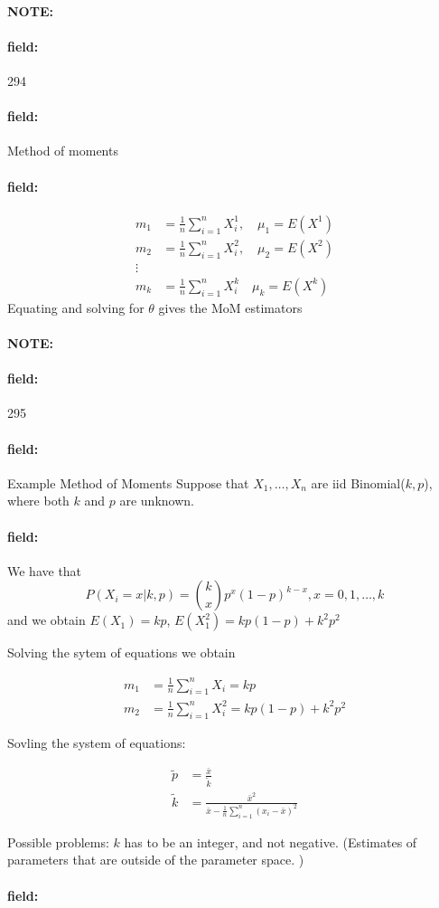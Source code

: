 \documentclass[12pt]{article}
\newenvironment{note}{\paragraph{NOTE:}}{}
\newenvironment{field}{\paragraph{field:}}{}
\begin{document}
\begin{note} \begin{field} \tiny 294 \end{field}
  \begin{field}
    Method of moments
  \end{field}
  \begin{field}
    \begin{align*}
      m_1 &= \frac{1}{n}\sum _{i = 1}^n X_i^1, \quad \mu_1 = E(X^1)\\
      m_2 &= \frac{1}{n}\sum _{i = 1}^n X_i^2, \quad \mu_2 = E(X^2)\\
      \vdots & \\
      m_k &= \frac{1}{n} \sum _{i = 1}^n X_i^k \quad \mu_k = E(X^k)
    \end{align*}
    Equating and solving for $\theta$ gives the MoM estimators
  \end{field}
\end{note}

\begin{note} \begin{field} \tiny 295 \end{field}
  \begin{field}
    Example Method of Moments
    Suppose that $X_1, \ldots , X_n$ are iid Binomial($k,p$), where both $k$ and $p$ are unknown.
  \end{field}
  \begin{field}
    We have that
    $$ P(X_i = x|k,p) = \binom{k}{x}p^x(1-p)^{k-x}, x = 0,1,\ldots,k$$
     and we obtain $E(X_1) = kp$, $E(X_1^2) = kp(1-p) + k^2p^2$

    Solving the sytem of equations we obtain

    \begin{align*}
      m_1 &= \frac{1}{n} \sum _{i = 1}^n X_i = kp\\
      m_2 &= \frac{1}{n} \sum _{i = 1}^n X_i^2 = kp(1-p) + k^2p^2
    \end{align*}

    Sovling the system of equations:

    \begin{align*}
      \tilde{p} &= \frac{\bar{x}}{\tilde{k}}\\
      \tilde{k} &= \frac{\bar{x}^2}{\bar{x} - \frac{1}{n} \sum _{i = 1}^n (x_i - \bar{x})^2}
    \end{align*}

    Possible problems: $k$ has to be an integer, and not negative. (Estimates of parameters that are outside of the parameter space. )
  \end{field}
  \begin{field}

  \end{field}
\end{note}
\end{document}
